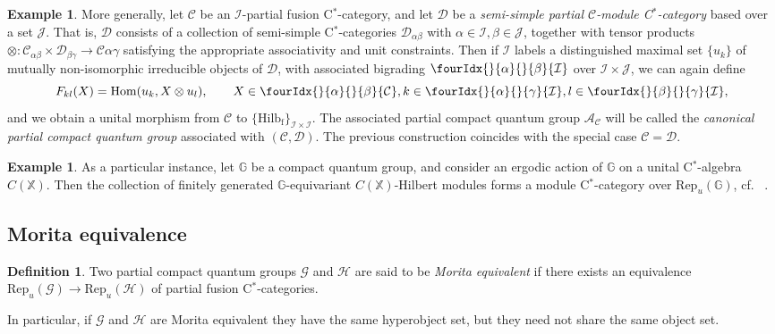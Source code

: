 \documentclass[10pt]{article}
\DeclareMathOperator{\fin}{\mathrm{f}}
\DeclareMathOperator{\Hom}{Hom}
\newcommand{\G}{\mathbb{G}}
\newcommand{\CatC}{\mathcal{C}}
\newcommand{\CatD}{\mathcal{D}}
\newcommand{\CatCC}{\mathscr{C}}
\newcommand{\CatDD}{\mathscr{D}}
\newcommand{\Hilb}{\mathrm{Hilb}}
\newcommand{\Rep}{\mathrm{Rep}}
\newcommand{\Gr}[5]{\fourIdx{#2}{#4}{#3}{#5}{#1}}%
\newcommand{\Gru}[3]{\Gr{#1}{}{}{#2}{#3}}
\theoremstyle{definition}
\newtheorem{Def}[Theorem]{Definition}
\newtheorem{Exa}[Theorem]{Example}
\numberwithin{equation}{section}
\begin{document}
\begin{Exa} More generally, let $\CatCC$ be an $\mathscr{I}$-partial fusion C$^*$-category, and let $\CatDD$ be a \emph{semi-simple partial $\CatCC$-module C$^*$-category} based over a set $\mathscr{J}$. That is, $\CatDD$ consists of a collection of semi-simple C$^*$-categories $\CatD_{\alpha\beta}$ with $\alpha\in \mathscr{I},\beta\in \mathscr{J}$, together with tensor products $\otimes: \CatC_{\alpha\beta}\times \CatD_{\beta\gamma}\rightarrow \CatC{\alpha\gamma}$ satisfying the appropriate associativity and unit constraints. Then if $\mathcal{I}$ labels a distinguished maximal set $\{u_k\}$ of mutually non-isomorphic irreducible objects of $\CatD$, with associated bigrading $\Gru{\mathcal{I}}{\alpha}{\beta}$ over $\mathscr{I}\times \mathscr{J}$, we can again define \[F_{kl}(X)  = \Hom(u_k,  X\otimes u_l),\qquad X\in \Gru{\CatC}{\alpha}{\beta}, k\in \Gru{\mathcal{I}}{\alpha}{\gamma},l\in \Gru{\mathcal{I}}{\beta}{\gamma},\] and we obtain a unital morphism from $\CatCC$ to $\{\Hilb_{\fin}\}_{\mathcal{I}\times \mathcal{I}}$. The associated partial compact quantum group $\mathscr{A}_{\CatCC}$ will be called the \emph{canonical partial compact quantum group} associated with $(\CatCC,\CatDD)$. The previous construction coincides with the special case $\CatCC= \CatDD$.
\end{Exa}

\begin{Exa}\label{ExaErgo} As a particular instance, let $\G$ be a compact quantum group, and consider an ergodic action of $\G$ on a unital C$^*$-algebra $C(\mathbb{X})$. Then the collection of finitely generated $\G$-equivariant $C(\mathbb{X})$-Hilbert modules forms a module C$^*$-category over $\Rep_u(\G)$, cf.~ \cite{DCY1}. 
\end{Exa}

\subsection{Morita equivalence}


\begin{Def} Two partial compact quantum groups $\mathscr{G}$ and $\mathscr{H}$ are said to be \emph{Morita equivalent} if there exists an equivalence $\Rep_u(\mathscr{G}) \rightarrow \Rep_u(\mathscr{H})$ of partial fusion C$^*$-categories. 
\end{Def} 

In particular, if $\mathscr{G}$ and $\mathscr{H}$ are Morita equivalent they have the same hyperobject set, but they need not share the same object set.
\end{document}
